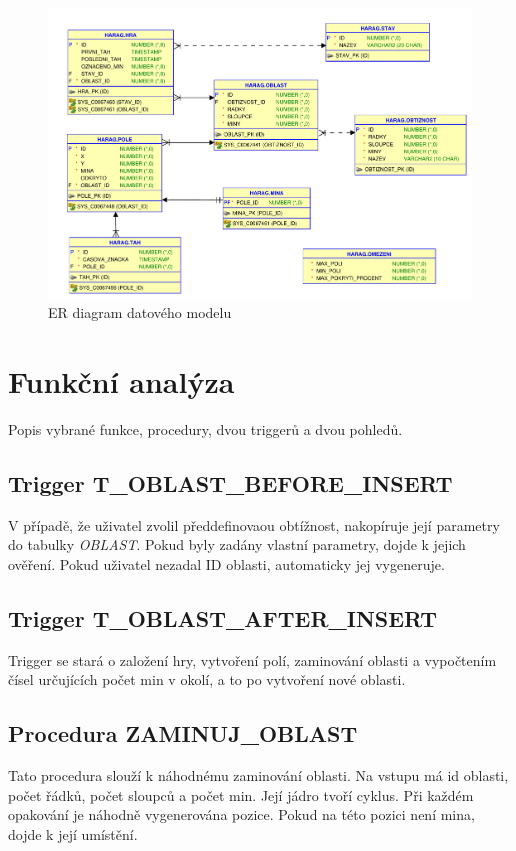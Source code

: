 \documentclass[12pt, a4paper]{article}
\begin{document}
\begin{figure}[h]
	\centering
	\includegraphics[width=1\linewidth]{model}
	\caption{ER diagram datového modelu}
	\label{fig:model}
\end{figure}

\section{Funkční analýza}
Popis vybrané funkce, procedury, dvou triggerů a dvou pohledů.

\subsection{Trigger T\_OBLAST\_BEFORE\_INSERT}
V případě, že uživatel zvolil předdefinovaou obtížnost, nakopíruje její parametry do tabulky \emph{OBLAST}.
Pokud byly zadány vlastní parametry, dojde k jejich ověření.
Pokud uživatel nezadal ID oblasti, automaticky jej vygeneruje.


\subsection{Trigger T\_OBLAST\_AFTER\_INSERT}
Trigger se stará o založení hry, vytvoření polí, zaminování oblasti a vypočtením čísel určujících počet min v okolí, a to po vytvoření nové oblasti.


\subsection{Procedura ZAMINUJ\_OBLAST}
Tato procedura slouží k náhodnému zaminování oblasti.
Na vstupu má id oblasti, počet řádků, počet sloupců a počet min.
Její jádro tvoří cyklus. Při každém opakování je náhodně vygenerována pozice.
Pokud na této pozici není mina, dojde k její umístění.

\end{document}
